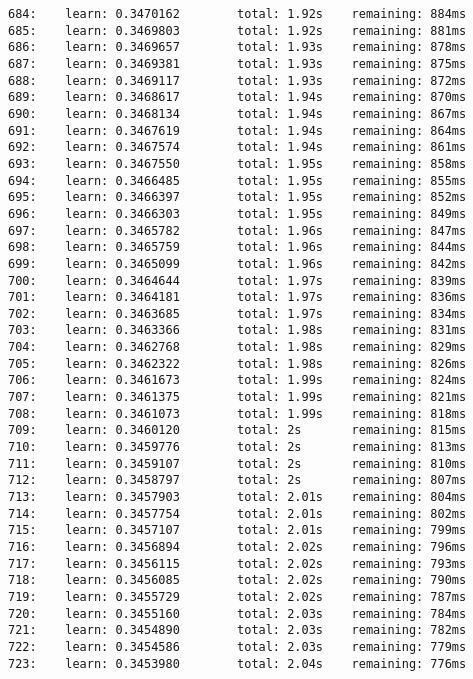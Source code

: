 \documentclass[11pt]{article}
\begin{document}
\begin{Verbatim}[commandchars=\\\{\}]
684:    learn: 0.3470162        total: 1.92s    remaining: 884ms
685:    learn: 0.3469803        total: 1.92s    remaining: 881ms
686:    learn: 0.3469657        total: 1.93s    remaining: 878ms
687:    learn: 0.3469381        total: 1.93s    remaining: 875ms
688:    learn: 0.3469117        total: 1.93s    remaining: 872ms
689:    learn: 0.3468617        total: 1.94s    remaining: 870ms
690:    learn: 0.3468134        total: 1.94s    remaining: 867ms
691:    learn: 0.3467619        total: 1.94s    remaining: 864ms
692:    learn: 0.3467574        total: 1.94s    remaining: 861ms
693:    learn: 0.3467550        total: 1.95s    remaining: 858ms
694:    learn: 0.3466485        total: 1.95s    remaining: 855ms
695:    learn: 0.3466397        total: 1.95s    remaining: 852ms
696:    learn: 0.3466303        total: 1.95s    remaining: 849ms
697:    learn: 0.3465782        total: 1.96s    remaining: 847ms
698:    learn: 0.3465759        total: 1.96s    remaining: 844ms
699:    learn: 0.3465099        total: 1.96s    remaining: 842ms
700:    learn: 0.3464644        total: 1.97s    remaining: 839ms
701:    learn: 0.3464181        total: 1.97s    remaining: 836ms
702:    learn: 0.3463685        total: 1.97s    remaining: 834ms
703:    learn: 0.3463366        total: 1.98s    remaining: 831ms
704:    learn: 0.3462768        total: 1.98s    remaining: 829ms
705:    learn: 0.3462322        total: 1.98s    remaining: 826ms
706:    learn: 0.3461673        total: 1.99s    remaining: 824ms
707:    learn: 0.3461375        total: 1.99s    remaining: 821ms
708:    learn: 0.3461073        total: 1.99s    remaining: 818ms
709:    learn: 0.3460120        total: 2s       remaining: 815ms
710:    learn: 0.3459776        total: 2s       remaining: 813ms
711:    learn: 0.3459107        total: 2s       remaining: 810ms
712:    learn: 0.3458797        total: 2s       remaining: 807ms
713:    learn: 0.3457903        total: 2.01s    remaining: 804ms
714:    learn: 0.3457754        total: 2.01s    remaining: 802ms
715:    learn: 0.3457107        total: 2.01s    remaining: 799ms
716:    learn: 0.3456894        total: 2.02s    remaining: 796ms
717:    learn: 0.3456115        total: 2.02s    remaining: 793ms
718:    learn: 0.3456085        total: 2.02s    remaining: 790ms
719:    learn: 0.3455729        total: 2.02s    remaining: 787ms
720:    learn: 0.3455160        total: 2.03s    remaining: 784ms
721:    learn: 0.3454890        total: 2.03s    remaining: 782ms
722:    learn: 0.3454586        total: 2.03s    remaining: 779ms
723:    learn: 0.3453980        total: 2.04s    remaining: 776ms

\end{Verbatim}
\end{document}
